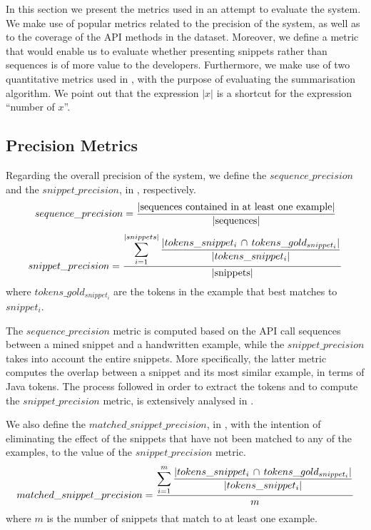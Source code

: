 In this section we present the metrics used in an attempt to evaluate the system. We make use of popular metrics related to the precision of the system, as well as to the coverage of the API methods in the dataset. Moreover, we define a metric that would enable us to evaluate whether presenting snippets rather than sequences is of more value to the developers. Furthermore, we make use of two quantitative metrics used in \cite{Buse:2012}, with the purpose of evaluating the summarisation algorithm. We point out that the expression $|x|$ is a shortcut for the expression ``number of $x$''.


\subsection{Precision Metrics}
\label{subsec:evaluation-precision}

Regarding the overall precision of the system, we define the $sequence\_precision$ and the $snippet\_precision$, in , respectively.
%
\vspace{1ex}
\begin{equation}
 \label{eq:sequence-precision}
 \centering
  sequence\_precision = 
  \frac{ | \text{sequences contained in at least one example} | }
       { | \text{sequences} | }
\end{equation}
%
\begin{equation}
 \label{eq:snippet-precision}
 \centering
  snippet\_precision = 
  \frac{ \displaystyle\sum_{i=1}^{|snippets|}
   \frac{ | tokens\_snippet_i\, \cap \, tokens\_gold_{snippet_i} | }
  		{ | tokens\_snippet_i | } }
        { | \text{snippets} | }
 \vspace{2ex}
\end{equation}
%
where $tokens\_gold_{snippet_i}$ are the tokens in the example that best matches to $snippet_i$.

The $sequence\_precision$ metric is computed based on the API call sequences between a mined snippet and a handwritten example, while the $snippet\_precision$ takes into account the entire snippets. More specifically, the latter metric computes the overlap between a snippet and its most similar example, in terms of Java tokens. The process followed in order to extract the tokens and to compute the $snippet\_precision$ metric, is extensively analysed in .

We also define the $matched\_snippet\_precision$, in , with the intention of eliminating the effect of the snippets that have not been matched to any of the examples, to the value of the $snippet\_precision$ metric.
\vspace{1.5ex}
%
\begin{equation}
 \label{eq:matched-snippet-precision}
 \centering
  matched\_snippet\_precision = 
  \frac{ \displaystyle\sum_{i=1}^{m} 
  	\frac{ | tokens\_snippet_i \, \cap \, tokens\_gold_{snippet_i} | }
  		 { | tokens\_snippet_i | } }
       { m }
 \vspace{1.5ex}
\end{equation}
%
where $m$ is the number of snippets that match to at least one example.


